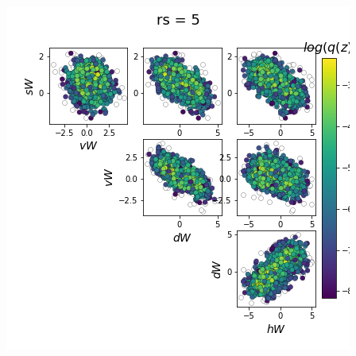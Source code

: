 \documentclass[11pt]{article}
\begin{document}
\begin{center}
\includegraphics[scale=0.33]{figs/Z_SC_pvar_reduced_c=0_p=80_rs=5.png}
\end{center}
\end{document}
